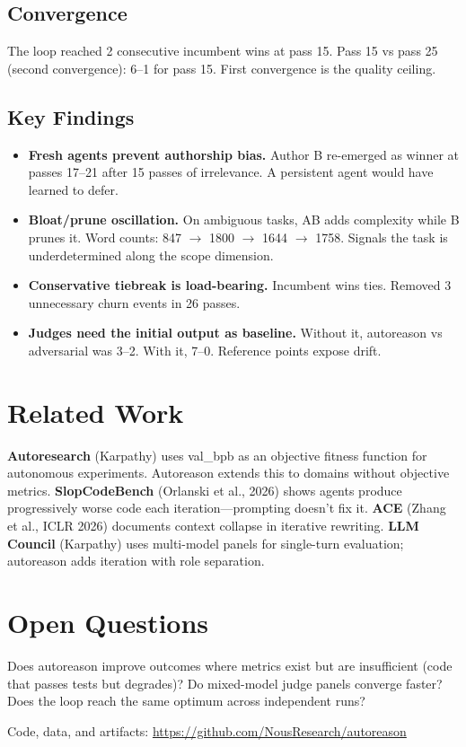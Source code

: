 \documentclass[10pt,twocolumn]{article}
\begin{document}
\subsection{Convergence}

The loop reached 2 consecutive incumbent wins at pass 15. Pass 15 vs pass 25 (second convergence): 6--1 for pass 15. First convergence is the quality ceiling.

\subsection{Key Findings}

\begin{itemize}
\item \textbf{Fresh agents prevent authorship bias.} Author B re-emerged as winner at passes 17--21 after 15 passes of irrelevance. A persistent agent would have learned to defer.
\item \textbf{Bloat/prune oscillation.} On ambiguous tasks, AB adds complexity while B prunes it. Word counts: 847 $\to$ 1800 $\to$ 1644 $\to$ 1758. Signals the task is underdetermined along the scope dimension.
\item \textbf{Conservative tiebreak is load-bearing.} Incumbent wins ties. Removed 3 unnecessary churn events in 26 passes.
\item \textbf{Judges need the initial output as baseline.} Without it, autoreason vs adversarial was 3--2. With it, 7--0. Reference points expose drift.
\end{itemize}

\section{Related Work}

\textbf{Autoresearch} (Karpathy) uses val\_bpb as an objective fitness function for autonomous experiments. Autoreason extends this to domains without objective metrics. \textbf{SlopCodeBench} (Orlanski et al., 2026) shows agents produce progressively worse code each iteration---prompting doesn't fix it. \textbf{ACE} (Zhang et al., ICLR 2026) documents context collapse in iterative rewriting. \textbf{LLM Council} (Karpathy) uses multi-model panels for single-turn evaluation; autoreason adds iteration with role separation.

\section{Open Questions}

Does autoreason improve outcomes where metrics exist but are insufficient (code that passes tests but degrades)? Do mixed-model judge panels converge faster? Does the loop reach the same optimum across independent runs?

\vfill
{\small Code, data, and artifacts: \url{https://github.com/NousResearch/autoreason}}
\end{document}
